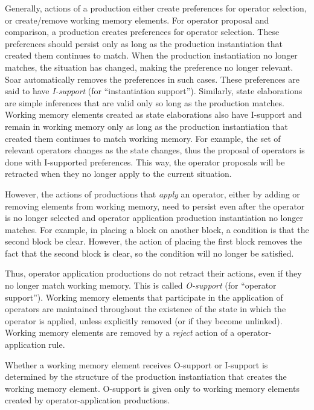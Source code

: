 Generally, actions of a production either create preferences for
operator selection, or create/remove working memory elements.  For
operator proposal and comparison, a production creates preferences for
operator selection.  These preferences should persist only as long as
the production instantiation that created them continues to match.  When
the production instantiation no longer matches, the situation has
changed, making the preference no longer relevant.  Soar automatically
removes the preferences in such cases.  These preferences are said to
have \emph{I-support} (for ``instantiation support'').  Similarly, state
elaborations are simple inferences that are valid only so long as the
production matches.  Working memory elements created as state
elaborations also have I-support and remain in working memory only as
long as the production instantiation that created them continues to
match working memory.  For example, the set of relevant operators changes
as the state changes, thus the proposal of operators is done with
I-supported preferences. This way, the operator proposals will be
retracted when they no longer apply to the current situation.

However, the actions of productions that \emph{apply} an operator, either by
adding or removing elements from working memory, need to persist even
after the operator is no longer selected and operator application
production instantiation no longer matches.  For example, in placing a
block on another block, a condition is that the second block be
clear. However, the action of placing the first block removes the fact
that the second block is clear, so the condition will no longer be
satisfied.

Thus, operator application productions do not retract their actions, even
if they no longer match working memory.  This is called \emph{O-support}
(for ``operator support''). Working memory elements that participate in
the application of operators are maintained throughout the existence of
the state in which the operator is applied, unless explicitly removed (or
if they become unlinked).  Working memory elements are removed by a
\emph{reject} action of a operator-application rule.  

Whether a working memory element receives O-support or I-support is
determined by the structure of the production instantiation that creates
the working memory element.  O-support is given only to working memory
elements created by operator-application productions.

